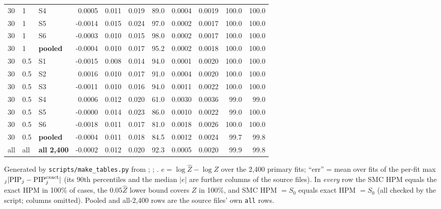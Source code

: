 {\begin{longtable}{lllrrrrrrrr}
30 & 1 & S4 & 0.0005 & 0.011 & 0.019 & 89.0 & 0.0004 & 0.0019 & 100.0 & 100.0 \\
30 & 1 & S5 & -0.0014 & 0.015 & 0.024 & 97.0 & 0.0002 & 0.0017 & 100.0 & 100.0 \\
30 & 1 & S6 & -0.0003 & 0.010 & 0.015 & 98.0 & 0.0002 & 0.0017 & 100.0 & 100.0 \\
30 & 1 & \textbf{pooled} & -0.0004 & 0.010 & 0.017 & 95.2 & 0.0002 & 0.0018 & 100.0 & 100.0 \\
\midrule
30 & 0.5 & S1 & -0.0015 & 0.008 & 0.014 & 94.0 & 0.0001 & 0.0020 & 100.0 & 100.0 \\
30 & 0.5 & S2 & 0.0016 & 0.010 & 0.017 & 91.0 & 0.0004 & 0.0020 & 100.0 & 100.0 \\
30 & 0.5 & S3 & -0.0011 & 0.010 & 0.016 & 94.0 & 0.0011 & 0.0022 & 100.0 & 100.0 \\
30 & 0.5 & S4 & 0.0006 & 0.012 & 0.020 & 61.0 & 0.0030 & 0.0036 & 99.0 & 99.0 \\
30 & 0.5 & S5 & -0.0000 & 0.014 & 0.023 & 86.0 & 0.0010 & 0.0022 & 99.0 & 100.0 \\
30 & 0.5 & S6 & -0.0018 & 0.011 & 0.017 & 81.0 & 0.0018 & 0.0026 & 100.0 & 100.0 \\
30 & 0.5 & \textbf{pooled} & -0.0004 & 0.011 & 0.018 & 84.5 & 0.0012 & 0.0024 & 99.7 & 99.8 \\
\midrule
all & all & \textbf{all 2,400} & -0.0002 & 0.012 & 0.020 & 92.3 & 0.0005 & 0.0020 & 99.9 & 99.8 \\
\end{longtable}}
\par{\footnotesize Generated by \texttt{scripts/make\_tables.py} from ; ; . $e=\log\hat Z-\log Z$ over the 2,400 primary fits; ``err'' = mean over fits of the per-fit max$_j|\mathrm{PIP}_j-\mathrm{PIP}^{\rm exact}_j|$ (its 90th percentiles and the median $|e|$ are further columns of the source files). In \emph{every} row the SMC HPM equals the exact HPM in 100\% of cases, the $0.05\hat Z$ lower bound covers $Z$ in 100\%, and SMC HPM $=S_0$ equals exact HPM $=S_0$ (all checked by the script; columns omitted). Pooled and all-2,400 rows are the source files' own \texttt{all} rows.}\par
